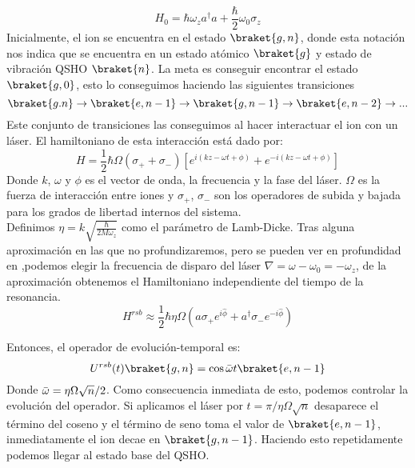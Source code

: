 \begin{equation}
    H_{0}=\hbar\omega_{z}a^{\dagger}a+\frac{\hbar}{2}\omega_{0}\sigma_{z}
\end{equation}
Inicialmente, el ion se encuentra en el estado $\braket{g,n}$, donde esta notación nos indica que se encuentra en un estado atómico $\braket{g}$ y estado de vibración QSHO $\braket{n}$. La meta es conseguir encontrar el estado $\braket{g,0}$, esto lo conseguimos haciendo las siguientes transiciones
\begin{equation}
    \braket{g.n}\rightarrow\braket{e,n-1}\rightarrow\braket{g,n-1}\rightarrow\braket{e,n-2}\rightarrow...
\end{equation}
Este conjunto de transiciones las conseguimos al hacer interactuar el ion con un láser. El hamiltoniano de esta interacción está dado por:
\begin{equation}
    H=\frac{1}{2}\hbar\Omega(\sigma_{+}+\sigma_{-})\left[e^{i(kz-\omega t+\phi)}+e^{-i(kz-\omega t+\phi)}\right]
\end{equation}
Donde $k$, $\omega$ y $\phi$ es el vector de onda, la frecuencia y la fase del láser. $\Omega$ es la fuerza de interacción entre iones y $\sigma_{+}$, $\sigma_{-}$ son los operadores de subida y bajada para los grados de libertad internos del sistema.\\
Definimos $\eta=k\sqrt{\frac{\hbar}{2M\omega_{z}}}$ como el parámetro de Lamb-Dicke. Tras alguna aproximación en las que no profundizaremos, pero se pueden ver en profundidad en \cite{Bernardini_trapped_ions}
,podemos elegir la frecuencia de disparo del láser $\nabla=\omega-\omega_{0}=-\omega_{z}$, de la aproximación obtenemos el Hamiltoniano independiente del tiempo de la resonancia.
\begin{equation}
    H^{rsb}\approx\frac{1}{2}\hbar\eta\Omega(a\sigma_{+}e^{i\hat{\phi}}+a^{\dagger}\sigma_{-}e^{-i\hat{\phi}})
\end{equation}

Entonces, el operador de evolución-temporal es:
\begin{equation}
    U^{rsb}(t)\braket{g,n}=\cos{\Bar{\omega}t}\braket{e,n-1}
\end{equation}
Donde $\Bar{\omega}=\eta\Omega\sqrt{n}/2$. Como consecuencia inmediata de esto, podemos controlar la evolución del operador. 
Si aplicamos el láser por $t=\pi/\eta\Omega\sqrt{n}$ desaparece el término del coseno y el término de seno toma el valor de $\braket{e,n-1}$, inmediatamente el ion decae en $\braket{g,n-1}$. Haciendo esto repetidamente podemos llegar al estado base del QSHO.
